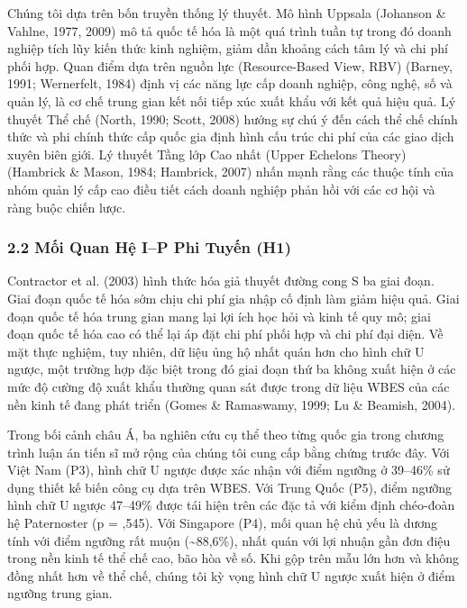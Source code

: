 \documentclass[12pt,a4paper]{article}
\begin{document}
Chúng tôi dựa trên bốn truyền thống lý thuyết. Mô hình Uppsala (Johanson
\& Vahlne, 1977, 2009) mô tả quốc tế hóa là một quá trình tuần tự trong
đó doanh nghiệp tích lũy kiến thức kinh nghiệm, giảm dần khoảng cách tâm
lý và chi phí phối hợp. Quan điểm dựa trên nguồn lực (Resource-Based
View, RBV) (Barney, 1991; Wernerfelt, 1984) định vị các năng lực cấp
doanh nghiệp, công nghệ, số và quản lý, là cơ chế trung gian kết nối
tiếp xúc xuất khẩu với kết quả hiệu quả. Lý thuyết Thể chế (North, 1990;
Scott, 2008) hướng sự chú ý đến cách thể chế chính thức và phi chính
thức cấp quốc gia định hình cấu trúc chi phí của các giao dịch xuyên
biên giới. Lý thuyết Tầng lớp Cao nhất (Upper Echelons Theory) (Hambrick
\& Mason, 1984; Hambrick, 2007) nhấn mạnh rằng các thuộc tính của nhóm
quản lý cấp cao điều tiết cách doanh nghiệp phản hồi với các cơ hội và
ràng buộc chiến lược.

\hypertarget{22-mux1ed1i-quan-hux1ec7-ip-phi-tuyux1ebfn-h1}{%
\subsubsection{2.2 Mối Quan Hệ I--P Phi Tuyến
(H1)}\label{22-mux1ed1i-quan-hux1ec7-ip-phi-tuyux1ebfn-h1}}

Contractor et al. (2003) hình thức hóa giả thuyết đường cong S ba giai
đoạn. Giai đoạn quốc tế hóa sớm chịu chi phí gia nhập cố định làm giảm
hiệu quả. Giai đoạn quốc tế hóa trung gian mang lại lợi ích học hỏi và
kinh tế quy mô; giai đoạn quốc tế hóa cao có thể lại áp đặt chi phí phối
hợp và chi phí đại diện. Về mặt thực nghiệm, tuy nhiên, dữ liệu ủng hộ
nhất quán hơn cho hình chữ U ngược, một trường hợp đặc biệt trong đó
giai đoạn thứ ba không xuất hiện ở các mức độ cường độ xuất khẩu thường
quan sát được trong dữ liệu WBES của các nền kinh tế đang phát triển
(Gomes \& Ramaswamy, 1999; Lu \& Beamish, 2004).

Trong bối cảnh châu Á, ba nghiên cứu cụ thể theo từng quốc gia trong
chương trình luận án tiến sĩ mở rộng của chúng tôi cung cấp bằng chứng
trước đây. Với Việt Nam (P3), hình chữ U ngược được xác nhận với điểm
ngưỡng ở 39--46\% sử dụng thiết kế biến công cụ dựa trên WBES. Với Trung
Quốc (P5), điểm ngưỡng hình chữ U ngược 47--49\% được tái hiện trên các
đặc tả với kiểm định chéo-đoàn hệ Paternoster (p = ,545). Với Singapore
(P4), mối quan hệ chủ yếu là dương tính với điểm ngưỡng rất muộn
(\textasciitilde88,6\%), nhất quán với lợi nhuận gần đơn điệu trong nền
kinh tế thể chế cao, bão hòa về số. Khi gộp trên mẫu lớn hơn và không
đồng nhất hơn về thể chế, chúng tôi kỳ vọng hình chữ U ngược xuất hiện ở
điểm ngưỡng trung gian.
\end{document}

